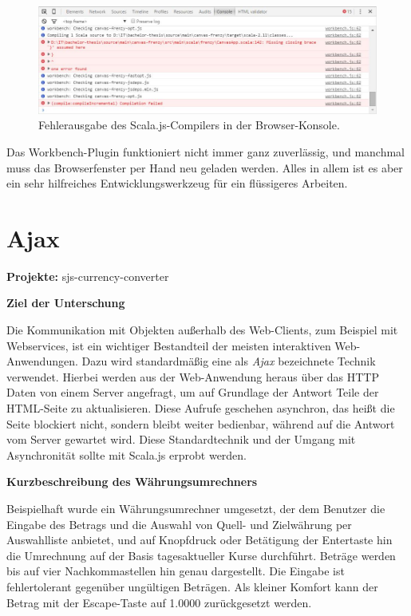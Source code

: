 \documentclass[a4paper, 12pt, hidelinks, listof=totoc, listoftables=totoc, bibliography=totoc]{scrreprt}
\newcommand{\MyMiniSec}[1]{\rmfamily\fontsize{12}{15}\selectfont
	\vspace{7pt}\textbf{#1} %
}
\begin{document}
\begin{figure}[!h]
    \centering
    \includegraphics[width=1.0\textwidth]{workbench-in-action2}
    \caption{Fehlerausgabe des Scala.js-Compilers in der Browser-Konsole.}
    \label{fig:workbench-in-action2}
\end{figure}

Das Workbench-Plugin funktioniert nicht immer ganz zuverlässig, und manchmal muss das Browserfenster per Hand neu geladen werden. Alles in allem ist es aber ein sehr hilfreiches Entwicklungswerkzeug für ein flüssigeres Arbeiten.


\pagebreak

\section{Ajax}

\textbf{Projekte:} sjs-currency-converter

\MyMiniSec{Ziel der Unterschung}

Die Kommunikation mit Objekten außerhalb des Web-Clients, zum Beispiel mit Webservices, ist ein wichtiger Bestandteil der meisten interaktiven Web-Anwendungen. Dazu wird standardmäßig eine als \emph{Ajax} bezeichnete Technik verwendet. Hierbei werden aus der Web-Anwendung heraus über das \ac{HTTP} Daten von einem Server angefragt, um auf Grundlage der Antwort Teile der \ac{HTML}-Seite zu aktualisieren. \cite[S.~491]{flanagan2011.JDG} Diese Aufrufe geschehen asynchron, das heißt die Seite blockiert nicht, sondern bleibt weiter bedienbar, während auf die Antwort vom Server gewartet wird. Diese Standardtechnik und der Umgang mit Asynchronität sollte mit Scala.js erprobt werden.


\MyMiniSec{Kurzbeschreibung des Währungsumrechners}

Beispielhaft wurde ein Währungsumrechner umgesetzt, der dem Benutzer die Eingabe des Betrags und die Auswahl von Quell- und Zielwährung per Auswahlliste anbietet, und auf Knopfdruck oder Betätigung der Entertaste hin die Umrechnung auf der Basis tagesaktueller Kurse durchführt. Beträge werden bis auf vier Nachkommastellen hin genau dargestellt. Die Eingabe ist fehlertolerant gegenüber ungültigen Beträgen. Als kleiner Komfort kann der Betrag mit der Escape-Taste auf 1.0000 zurückgesetzt werden.
\end{document}
